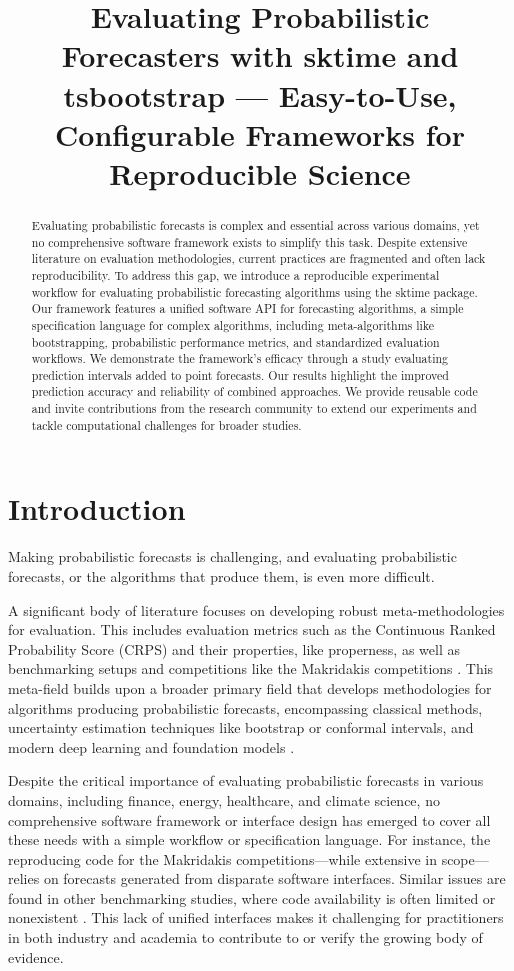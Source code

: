 \title{Evaluating Probabilistic Forecasters with sktime and tsbootstrap — Easy-to-Use, Configurable Frameworks for Reproducible Science}
\begin{abstract}
Evaluating probabilistic forecasts is complex and essential across various domains, yet no comprehensive software framework exists to simplify this task. Despite extensive literature on evaluation methodologies, current practices are fragmented and often lack reproducibility. To address this gap, we introduce a reproducible experimental workflow for evaluating probabilistic forecasting algorithms using the sktime package. Our framework features a unified software API for forecasting algorithms, a simple specification language for complex algorithms, including meta-algorithms like bootstrapping, probabilistic performance metrics, and standardized evaluation workflows. We demonstrate the framework's efficacy through a study evaluating prediction intervals added to point forecasts. Our results highlight the improved prediction accuracy and reliability of combined approaches. We provide reusable code and invite contributions from the research community to extend our experiments and tackle computational challenges for broader studies.

\end{abstract}

\section{Introduction}\label{introduction}
Making probabilistic forecasts is challenging, and evaluating probabilistic forecasts, or the algorithms that produce them, is even more difficult.

A significant body of literature focuses on developing robust meta-methodologies for evaluation. This includes evaluation metrics such as the Continuous Ranked Probability Score (CRPS) \citep{gneiting2014probabilistic} and their properties, like properness, as well as benchmarking setups and competitions like the Makridakis competitions \citep{makridakis2020_m4, makridakis2022_m5}. This meta-field builds upon a broader primary field that develops methodologies for algorithms producing probabilistic forecasts, encompassing classical methods, uncertainty estimation techniques like bootstrap or conformal intervals, and modern deep learning and foundation models \citep{chen2020probabilistic, nowotarski2018probabilistic, lagllama, decoder_foundation_forecasting}.

Despite the critical importance of evaluating probabilistic forecasts in various domains, including finance, energy, healthcare, and climate science, no comprehensive software framework or interface design has emerged to cover all these needs with a simple workflow or specification language. For instance, the reproducing code for the Makridakis competitions—while extensive in scope—relies on forecasts generated from disparate software interfaces. Similar issues are found in other benchmarking studies, where code availability is often limited or nonexistent \citep{semmelrock2023, kiraly2018}. This lack of unified interfaces makes it challenging for practitioners in both industry and academia to contribute to or verify the growing body of evidence.

